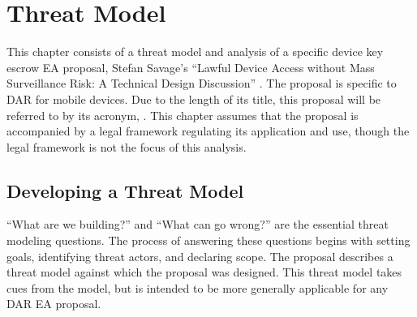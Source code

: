 \chapter{Threat Model}
\label{chap-threatmodel}

This chapter consists of a threat model and analysis of a specific device key escrow \ac{EA} proposal, Stefan Savage's
``Lawful Device Access without Mass Surveillance Risk: A Technical Design Discussion'' \cite{savage_lawful_2018}. The
proposal is specific to \acl{DAR} for mobile devices. Due to the length of its title, this proposal will be referred to
by its acronym, \ldawmsR. This chapter assumes that the proposal is accompanied by a legal framework regulating its
application and use, though the legal framework is not the focus of this analysis.



\section{Developing a Threat Model}

``What are we building?'' and ``What can go wrong?'' are the essential threat modeling questions. The process of
answering these questions begins with setting goals, identifying threat actors, and declaring scope. The \ldawmsr
proposal describes a threat model against which the proposal was designed. This threat model takes cues from the
\ldawmsr model, but is intended to be more generally applicable for any \ac{DAR} \ac{EA} proposal.

\newcommand{\modelstart}[0]{\begin{itemize}}
\newcommand{\modelitem}[2]{ %
    \item \textbf{#1} \nopagebreak

    \vspace{0.5\baselineskip} \parbox{\linewidth}{#2} \vspace{0.5\baselineskip}
}
\newcommand{\modelend}{\end{itemize}}


